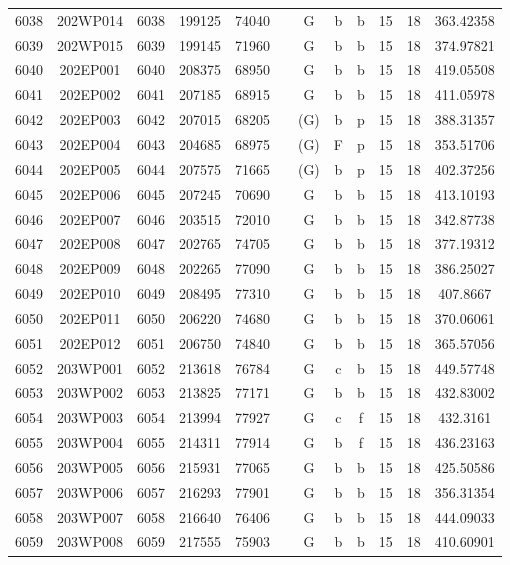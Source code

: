\begin{tabular}{|*{12}{c|}}
6038 & 202WP014 & 6038 & 199125 & 74040 &  & G & b & b & 15 & 18 & 363.42358 \\ 
6039 & 202WP015 & 6039 & 199145 & 71960 &  & G & b & b & 15 & 18 & 374.97821 \\ 
6040 & 202EP001 & 6040 & 208375 & 68950 &  & G & b & b & 15 & 18 & 419.05508 \\ 
6041 & 202EP002 & 6041 & 207185 & 68915 &  & G & b & b & 15 & 18 & 411.05978 \\ 
6042 & 202EP003 & 6042 & 207015 & 68205 &  & (G) & b & p & 15 & 18 & 388.31357 \\ 
6043 & 202EP004 & 6043 & 204685 & 68975 &  & (G) & F & p & 15 & 18 & 353.51706 \\ 
6044 & 202EP005 & 6044 & 207575 & 71665 &  & (G) & b & p & 15 & 18 & 402.37256 \\ 
6045 & 202EP006 & 6045 & 207245 & 70690 &  & G & b & b & 15 & 18 & 413.10193 \\ 
6046 & 202EP007 & 6046 & 203515 & 72010 &  & G & b & b & 15 & 18 & 342.87738 \\ 
6047 & 202EP008 & 6047 & 202765 & 74705 &  & G & b & b & 15 & 18 & 377.19312 \\ 
6048 & 202EP009 & 6048 & 202265 & 77090 &  & G & b & b & 15 & 18 & 386.25027 \\ 
6049 & 202EP010 & 6049 & 208495 & 77310 &  & G & b & b & 15 & 18 & 407.8667 \\ 
6050 & 202EP011 & 6050 & 206220 & 74680 &  & G & b & b & 15 & 18 & 370.06061 \\ 
6051 & 202EP012 & 6051 & 206750 & 74840 &  & G & b & b & 15 & 18 & 365.57056 \\ 
6052 & 203WP001 & 6052 & 213618 & 76784 &  & G & c & b & 15 & 18 & 449.57748 \\ 
6053 & 203WP002 & 6053 & 213825 & 77171 &  & G & b & b & 15 & 18 & 432.83002 \\ 
6054 & 203WP003 & 6054 & 213994 & 77927 &  & G & c & f & 15 & 18 & 432.3161 \\ 
6055 & 203WP004 & 6055 & 214311 & 77914 &  & G & b & f & 15 & 18 & 436.23163 \\ 
6056 & 203WP005 & 6056 & 215931 & 77065 &  & G & b & b & 15 & 18 & 425.50586 \\ 
6057 & 203WP006 & 6057 & 216293 & 77901 &  & G & b & b & 15 & 18 & 356.31354 \\ 
6058 & 203WP007 & 6058 & 216640 & 76406 &  & G & b & b & 15 & 18 & 444.09033 \\ 
6059 & 203WP008 & 6059 & 217555 & 75903 &  & G & b & b & 15 & 18 & 410.60901 \\ 

\end{tabular}
